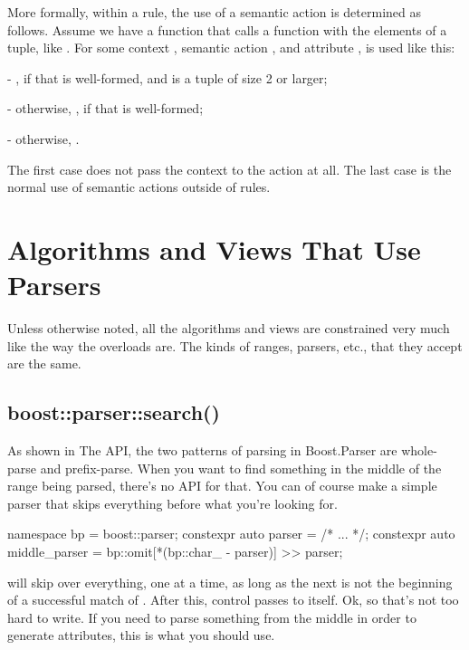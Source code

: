\documentclass{MyBook}
\begin{document}
More formally, within a rule, the use of a semantic action is determined as follows. Assume we have a function  that calls a function with the elements of a tuple, like . For some context , semantic action , and attribute ,  is used like this:

- , if that is well-formed, and  is a tuple of size 2 or larger;

- otherwise, , if that is well-formed;

- otherwise, .

The first case does not pass the context to the action at all. The last case is the normal use of semantic actions outside of rules.

\section{Algorithms and Views That Use Parsers}

Unless otherwise noted, all the algorithms and views are constrained very much like the way the  overloads are. The kinds of ranges, parsers, etc., that they accept are the same.

\subsection{boost::parser::search()}

As shown in The  API, the two patterns of parsing in Boost.Parser are whole-parse and prefix-parse. When you want to find something in the middle of the range being parsed, there's no  API for that. You can of course make a simple parser that skips everything before what you're looking for.

\begin{code}
namespace bp = boost::parser;
constexpr auto parser = /* ... */;
constexpr auto middle_parser = bp::omit[*(bp::char_ - parser)] >> parser;
\end{code}

 will skip over everything, one  at a time, as long as the next  is not the beginning of a successful match of . After this, control passes to  itself. Ok, so that's not too hard to write. If you need to parse something from the middle in order to generate attributes, this is what you should use.
\end{document}
